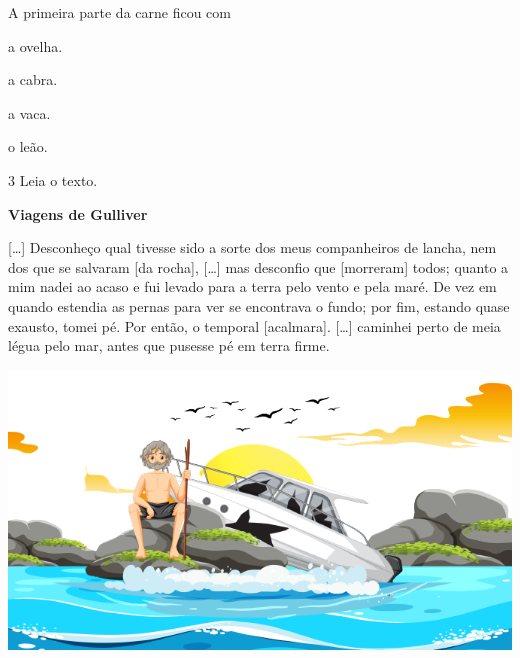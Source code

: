 A primeira parte da carne ficou com

\begin{multicols}{2}
\begin{escolha}

\item a ovelha.

\item a cabra.

\item a vaca.

\item o leão.

\end{escolha}
\end{multicols}

\num{3} Leia o texto.

\begin{myquote}
\textbf{Viagens de Gulliver}

{[}\ldots{}{]} Desconheço qual tivesse sido a sorte dos meus
companheiros de lancha, nem dos que se salvaram [da rocha],
{[}\ldots{}{]} mas desconfio que [morreram] todos; quanto a mim nadei ao
acaso e fui levado para a terra pelo vento e pela maré. De vez em quando
estendia as pernas para ver se encontrava o fundo; por fim, estando
quase exausto, tomei pé. Por então, o temporal [acalmara]. {[}\ldots{}{]}
caminhei perto de meia légua pelo mar, antes que pusesse pé em terra
firme.

\begin{center}
\includegraphics[width=\textwidth]{./media/image23f.png}
\end{center}

\end{myquote}

